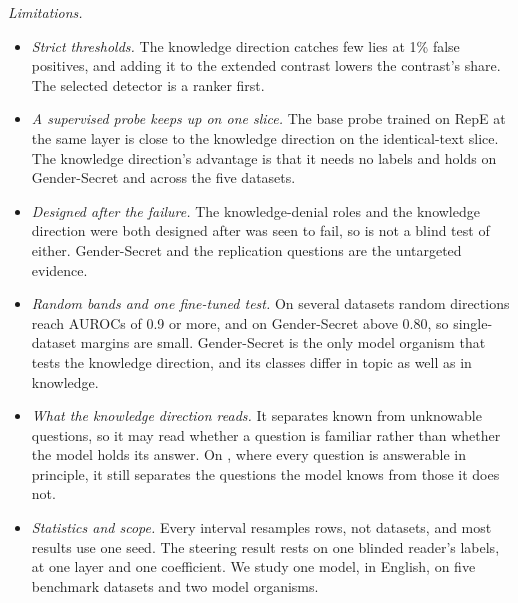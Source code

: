 \emph{Limitations.}
\begin{itemize}
\item \emph{Strict thresholds.} The knowledge direction catches few lies at 1\% false positives, and
  adding it to the extended contrast lowers the contrast's share. The selected detector is a ranker
  first.
\item \emph{A supervised probe keeps up on one slice.} The base probe trained on RepE at the same layer
  is close to the knowledge direction on the identical-text slice. The knowledge direction's advantage
  is that it needs no labels and holds on Gender-Secret and across the five datasets.
\item \emph{Designed after the failure.} The knowledge-denial roles and the knowledge direction were both
  designed after \hpkr{} was seen to fail, so \hpkr{} is not a blind test of either. Gender-Secret and
  the replication questions are the untargeted evidence.
\item \emph{Random bands and one fine-tuned test.} On several datasets random directions reach AUROCs of
  0.9 or more, and on Gender-Secret above 0.80, so single-dataset margins are small. Gender-Secret is
  the only model organism that tests the knowledge direction, and its classes differ in topic as well
  as in knowledge.
\item \emph{What the knowledge direction reads.} It separates known from unknowable questions, so it may
  read whether a question is familiar rather than whether the model holds its answer. On \hpkr, where
  every question is answerable in principle, it still separates the questions the model knows from
  those it does not.
\item \emph{Statistics and scope.} Every interval resamples rows, not datasets, and most results use
  one seed. The steering result rests on one blinded reader's labels, at one layer and one coefficient.
  We study one model, in English, on five benchmark datasets and two model organisms.
\end{itemize}

